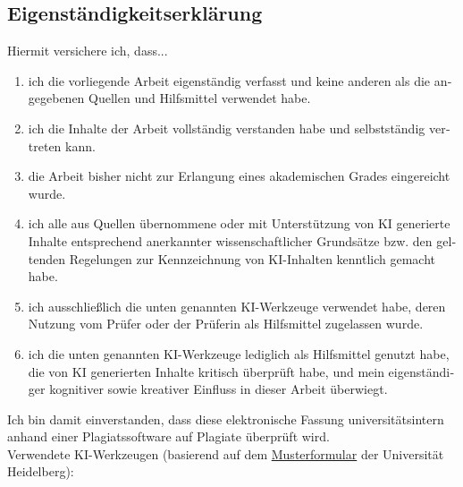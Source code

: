 \documentclass[
    pdftex,
    final,
    11pt,
    a4paper,
    parskip=false, %
    twoside, %
    footheight=0mm, %
    footinclude=false,
    toc=bibliography, %
    toc=listof %
]{scrbook} %
\begin{document}
\begin{otherlanguage}{ngerman}
\chapter*{Eigenständigkeitserklärung}
	
Hiermit versichere ich, dass...

\begin{enumerate}
    \item ich die vorliegende Arbeit eigenständig verfasst und keine anderen als die angegebenen Quellen und Hilfsmittel verwendet habe.
    \item ich die Inhalte der Arbeit vollständig verstanden habe und selbstständig vertreten kann.
    \item die Arbeit bisher nicht zur Erlangung eines akademischen Grades eingereicht wurde.
    \item ich alle aus Quellen übernommene oder mit Unterstützung von KI generierte Inhalte entsprechend anerkannter wissenschaftlicher Grundsätze bzw. den geltenden Regelungen zur Kennzeichnung von KI-Inhalten kenntlich gemacht habe.
    \item ich ausschließlich die unten genannten KI-Werkzeuge verwendet habe, deren Nutzung vom Prüfer oder der Prüferin als Hilfsmittel zugelassen wurde.
    \item ich die unten genannten KI-Werkzeuge lediglich als Hilfsmittel genutzt habe, die von KI generierten Inhalte kritisch überprüft habe, und mein eigenständiger kognitiver sowie kreativer Einfluss in dieser Arbeit überwiegt.
\end{enumerate}

Ich bin damit einverstanden, dass diese elektronische Fassung universitätsintern anhand einer Plagiatssoftware auf Plagiate überprüft wird.\\

Verwendete KI-Werkzeugen {\small(basierend auf dem \href{https://backend.heiskills.uni-heidelberg.de/de/dokumente/ki-formular-de/download}{Musterformular} der Universität Heidelberg)}:


\end{otherlanguage}
\end{document}
